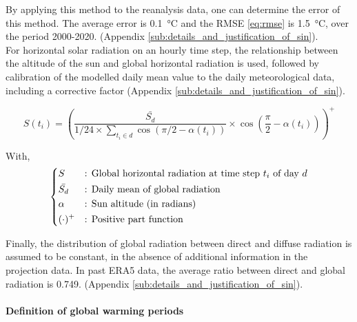 \documentclass[11pt]{article}
\begin{document}
        By applying this method to the reanalysis data, one can determine the error of this method. The average error is \SI{0.1}{\celsius} and the RMSE \eqref{eq:rmse} is \SI{1.5}{\celsius}, over the period 2000-2020. (Appendix \ref{sub:details_and_justification_of_sin}). \\

        For horizontal solar radiation on an hourly time step, the relationship between the altitude of the sun and global horizontal radiation is used, followed by calibration of the modelled daily mean value to the daily meteorological data, including a corrective factor (Appendix \ref{sub:details_and_justification_of_sin}).

        \begin{equation}\label{eq:solar_eq}
             S(t_i) = \left(\frac{\bar{S_d}}{1/24\times\sum_{t_i \in d} \cos\left(\pi/2-\alpha(t_i)\right)} \times \cos\left(\frac{\pi}{2}-\alpha(t_i)\right)\right)^+
        \end{equation} 

        \noindent
        With,
        $$
        \begin{dcases}
            S&\text{: Global horizontal radiation at time step $t_i$ of day $d$}\\
            \bar{S_d}&\text{: Daily mean of global radiation}\\
            \alpha&\text{: Sun altitude (in radians)}\\
            (\cdot)^+&\text{: Positive part function}\\
        \end{dcases}
        $$

        Finally, the distribution of global radiation between direct and diffuse radiation is assumed to be constant, in the absence of additional information in the projection data. In past ERA5 data, the average ratio between direct and global radiation is \num{0.749}. (Appendix \ref{sub:details_and_justification_of_sin}). 

        \paragraph{Definition of global warming periods}\mbox{}\\ %
        \label{par:gw_periods}
\end{document}
